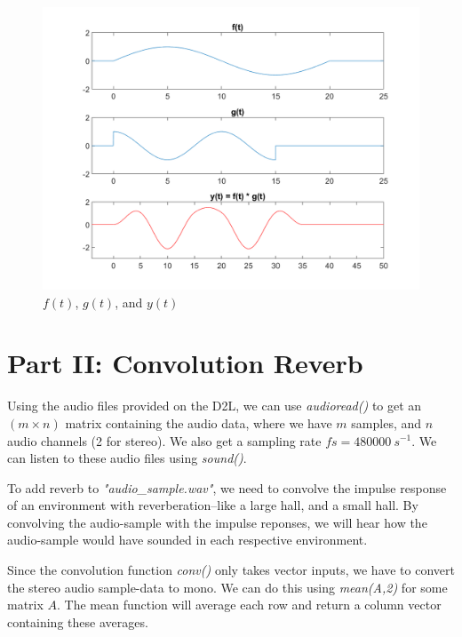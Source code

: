 \documentclass{article}
\begin{document}
\begin{figure}[!ht] 
    \centering
    \includegraphics[width = 15cm]{plot3.png}
    \caption{\(f(t)\), \(g(t)\), and \(y(t)\)}
    \label{fig:thirdplot}
\end{figure}

\clearpage

\section*{Part II: Convolution Reverb}

Using the audio files provided on the D2L, we can use \textit{audioread()} to get an \((m \times n)\) matrix containing the audio data, where we have \(m\) samples, and \(n\) audio channels (2 for stereo). We also get a sampling rate \(fs=480000~s^{-1}\). We can listen to these audio files using \textit{sound()}.

\bigskip

To add reverb to \textit{"audio\_sample.wav"}, we need to convolve the impulse response of an environment with reverberation--like a large hall, and a small hall. By convolving the audio-sample with the impulse reponses, we will hear how the audio-sample would have sounded in each respective environment.  

\bigskip

Since the convolution function \textit{conv()} only takes vector inputs, we have to convert the stereo audio sample-data to mono. We can do this using \textit{mean(A,2)} for some matrix \(A\). The mean function will average each row and return a column vector containing these averages.
\end{document}

